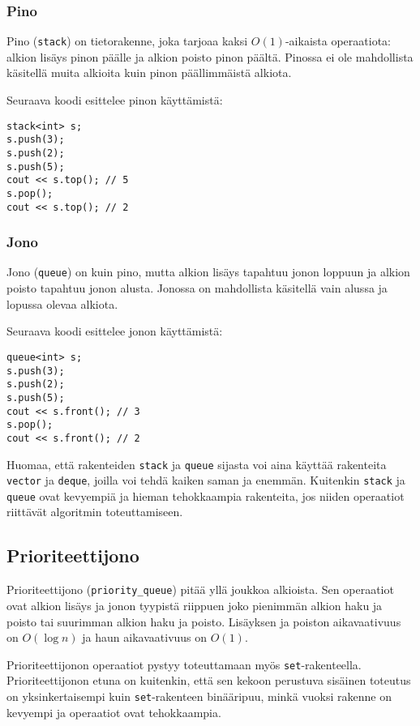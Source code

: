 \subsubsection{Pino}

Pino (\texttt{stack}) on tietorakenne,
joka tarjoaa kaksi $O(1)$-aikaista
operaatiota:
alkion lisäys pinon päälle ja alkion
poisto pinon päältä.
Pinossa ei ole mahdollista käsitellä muita
alkioita kuin pinon päällimmäistä alkiota.

Seuraava koodi esittelee pinon käyttämistä:

\begin{lstlisting}
stack<int> s;
s.push(3);
s.push(2);
s.push(5);
cout << s.top(); // 5
s.pop();
cout << s.top(); // 2
\end{lstlisting}
\subsubsection{Jono}

Jono (\texttt{queue}) on kuin pino,
mutta alkion lisäys tapahtuu jonon loppuun
ja alkion poisto tapahtuu jonon alusta.
Jonossa on mahdollista käsitellä vain
alussa ja lopussa olevaa alkiota.

Seuraava koodi esittelee jonon käyttämistä:

\begin{lstlisting}
queue<int> s;
s.push(3);
s.push(2);
s.push(5);
cout << s.front(); // 3
s.pop();
cout << s.front(); // 2
\end{lstlisting}

Huomaa, että rakenteiden \texttt{stack} ja \texttt{queue}
sijasta voi aina käyttää rakenteita
\texttt{vector} ja \texttt{deque}, joilla voi
tehdä kaiken saman ja enemmän.
Kuitenkin \texttt{stack} ja \texttt{queue} ovat
kevyempiä ja hieman tehokkaampia rakenteita,
jos niiden operaatiot riittävät algoritmin toteuttamiseen.

\subsection{Prioriteettijono}

Prioriteettijono (\texttt{priority\_queue})
pitää yllä joukkoa alkioista.
Sen operaatiot ovat alkion lisäys ja
jonon tyypistä riippuen joko
pienimmän alkion haku ja poisto tai
suurimman alkion haku ja poisto.
Lisäyksen ja poiston aikavaativuus on $O(\log n)$
ja haun aikavaativuus on $O(1)$.

Prioriteettijonon operaatiot
pystyy toteuttamaan myös \texttt{set}-rakenteella.
Prioriteettijonon etuna on kuitenkin,
että sen kekoon perustuva sisäinen
toteutus on yksinkertaisempi
kuin \texttt{set}-rakenteen binääripuu,
minkä vuoksi rakenne on kevyempi ja
operaatiot ovat tehokkaampia.

